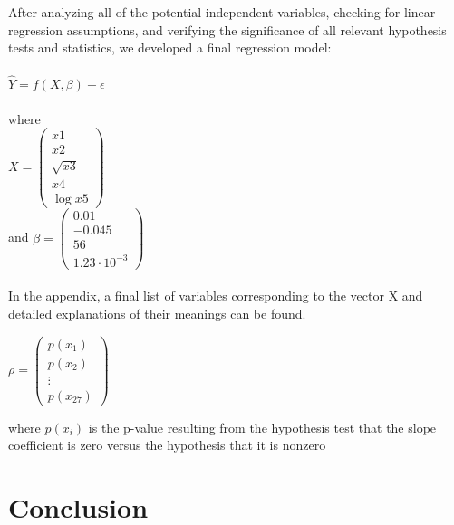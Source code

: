 \documentclass[oneside,12pt]{report}
\begin{document}
After analyzing all of the potential independent variables, checking for linear regression assumptions, and verifying the significance of all relevant hypothesis tests and statistics, we developed a final regression model:
\\
\\
\begin{math}
\hat{Y} = f(X,\beta) + \epsilon
\end{math}
\\
\\
where
\\
\begin{math} X = 
\begin{pmatrix}
x1 \\ x2 \\ \sqrt{x3} \\ x4 \\ \log{x5}
\end{pmatrix}
\end{math}
\\
and
\begin{math} \beta =
\begin{pmatrix}
0.01 \\ -0.045 \\ 56 \\ 1.23\cdot10^{-3}
\end{pmatrix}
\end{math}
\\ \\
In the appendix, a final list of variables corresponding to the vector X and detailed explanations of their meanings can be found.

\begin{math} \rho =
\begin{pmatrix}
p(x_1) \\ p(x_2) \\ \vdots \\p(x_{27})
\end{pmatrix}
\end{math}

where \begin{math}p(x_i)\end{math} is the p-value resulting from the hypothesis test that the slope coefficient is zero versus the hypothesis that it is nonzero

\chapter{Conclusion}
\end{document}

